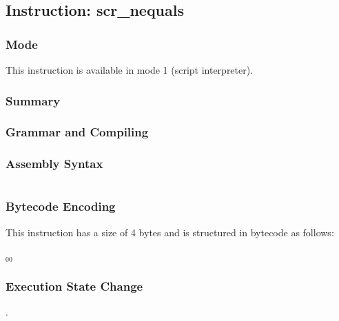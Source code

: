 \subsection{Instruction: scr\_nequals}

\subsubsection{Mode}
This instruction is available in mode 1 (script interpreter).
\subsubsection{Summary}


\subsubsection{Grammar and Compiling}


\subsubsection{Assembly Syntax}

\begin{myquote}
\begin{verbatim}

\end{verbatim}
\end{myquote}

\subsubsection{Bytecode Encoding}

This instruction has a size of 4 bytes and is structured in bytecode as follows:

$_{00}$\ 


\subsubsection{Execution State Change}

.



